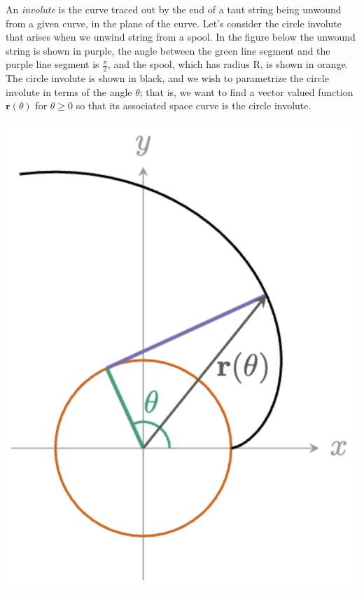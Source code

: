 \documentclass[12pt]{exam}
\begin{document}
\begin{questions}
\clearpage
\question An \textit{involute} is the curve traced out by the end of a taut string being unwound from a given curve, in the plane of the curve. Let's consider the circle involute that arises when we unwind string from a spool. In the figure below the unwound string is shown in purple, the angle between the green line segment and the purple line segment is $\frac{\pi}{2}$, and the spool, which has radius R, is shown in orange. The circle involute is shown in black, and we wish to parametrize the circle involute in terms of the angle $\theta$; that is, we want to find a vector valued function $\mathbf{r}(\theta)$ for $\theta \geq 0$ so that its associated space curve is the circle involute.\\
\begin{center}
	\includegraphics*[scale=0.3]{images/03-involute.png}
\end{center}
	\begin{parts} 

\end{parts}
\end{questions}
\end{document}
